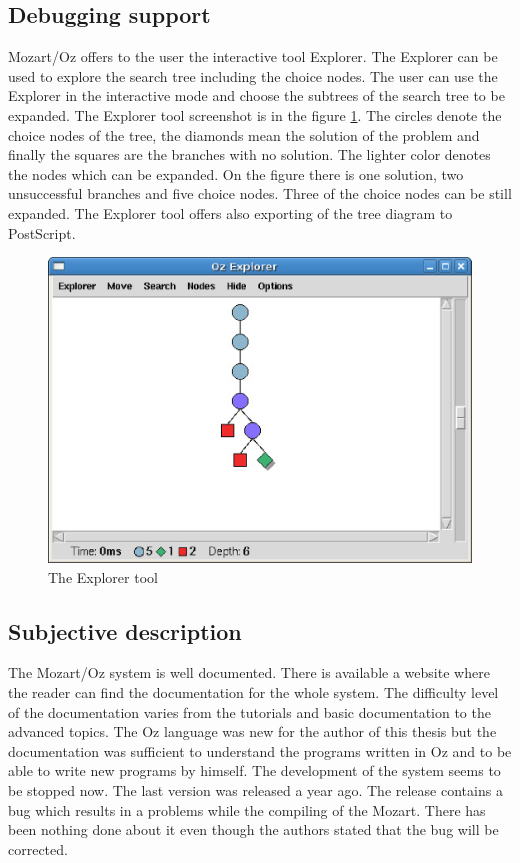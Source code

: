 \subsection{Debugging support}
Mozart/Oz offers to the user the interactive tool Explorer. The Explorer can be used to explore 
the search tree including the choice nodes. The user can use the Explorer in the 
interactive mode and choose the subtrees of the search tree to be expanded. 
 The Explorer tool screenshot is in the figure \ref{mozart:explorer}. The circles 
 denote the choice nodes of the tree, the diamonds mean the solution of
 the problem and finally the squares are the branches with no solution. The lighter color
 denotes the nodes which can be expanded. On the figure there is one solution, two 
 unsuccessful branches and five choice nodes. Three of the choice nodes can be still expanded.
 The Explorer tool offers also exporting of the tree diagram to PostScript.

\begin{figure}
\caption{\label{mozart:explorer}The Explorer tool}
\begin{center}
\includegraphics[scale=0.3]{images/screenshoty/explorer.eps}
\end{center}
\end{figure}


\subsection{Subjective description}
The Mozart/Oz system is well documented. There is available a website \cite{mozart:documentation} where the reader
can find the documentation for the whole system. The difficulty level of the documentation
varies from the tutorials and basic documentation to the advanced topics. The Oz language 
was new for the author of this thesis but the documentation was sufficient 
to understand the programs written in Oz and to be able to write new programs by
himself. The development of the system seems to be stopped now. The last version was released
a year ago. The release contains a bug which results in a problems while the compiling
of the Mozart. There has been nothing done about it even though the authors stated
that the bug will be corrected.